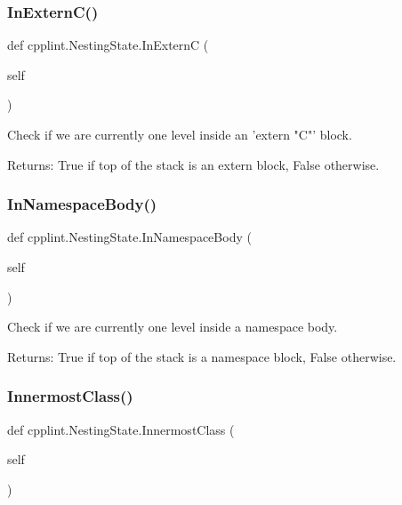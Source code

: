 \subsubsection{\texorpdfstring{In\+Extern\+C()}{InExternC()}}
{\footnotesize\ttfamily def cpplint.\+Nesting\+State.\+In\+ExternC (\begin{DoxyParamCaption}\item[{}]{self }\end{DoxyParamCaption})}

\begin{DoxyVerb}Check if we are currently one level inside an 'extern "C"' block.

Returns:
  True if top of the stack is an extern block, False otherwise.
\end{DoxyVerb}
 \mbox{\label{classcpplint_1_1NestingState_a1a06f50d53cfe11b1f78d45b531e0c32}} 
\subsubsection{\texorpdfstring{In\+Namespace\+Body()}{InNamespaceBody()}}
{\footnotesize\ttfamily def cpplint.\+Nesting\+State.\+In\+Namespace\+Body (\begin{DoxyParamCaption}\item[{}]{self }\end{DoxyParamCaption})}

\begin{DoxyVerb}Check if we are currently one level inside a namespace body.

Returns:
  True if top of the stack is a namespace block, False otherwise.
\end{DoxyVerb}
 \mbox{\label{classcpplint_1_1NestingState_a4141768e75b16698463670caaa587120}} 
\subsubsection{\texorpdfstring{Innermost\+Class()}{InnermostClass()}}
{\footnotesize\ttfamily def cpplint.\+Nesting\+State.\+Innermost\+Class (\begin{DoxyParamCaption}\item[{}]{self }\end{DoxyParamCaption})}

